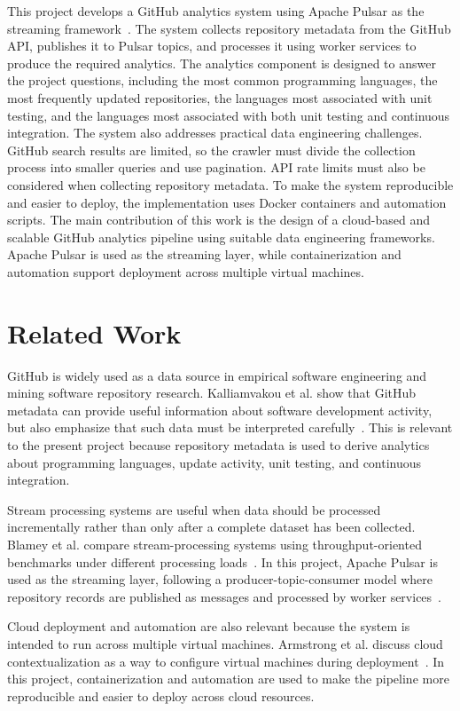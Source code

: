 \documentclass[conference]{IEEEtran}
\begin{document}
This project develops a GitHub analytics system using Apache Pulsar as the
streaming framework~\cite{apache_pulsar}. The system collects repository metadata from the GitHub
API, publishes it to Pulsar topics, and processes it using worker services to
produce the required analytics. The analytics component is designed to answer
the project questions, including the most common programming languages, the
most frequently updated repositories, the languages most associated with unit
testing, and the languages most associated with both unit testing and
continuous integration.
The system also addresses practical data engineering challenges. GitHub search
results are limited, so the crawler must divide the collection process into
smaller queries and use pagination. API rate limits must also be considered
when collecting repository metadata. To make the system reproducible and easier
to deploy, the implementation uses Docker containers and automation scripts.
The main contribution of this work is the design of a cloud-based and scalable
GitHub analytics pipeline using suitable data engineering frameworks. Apache
Pulsar is used as the streaming layer, while containerization and automation
support deployment across multiple virtual machines.

\section{Related Work}
\label{sec:related-work}
GitHub is widely used as a data source in empirical software engineering and
mining software repository research. Kalliamvakou et al. show that GitHub
metadata can provide useful information about software development activity, but
also emphasize that such data must be interpreted
carefully~\cite{kalliamvakou2014promises}. This is relevant to the present
project because repository metadata is used to derive analytics about
programming languages, update activity, unit testing, and continuous
integration.

Stream processing systems are useful when data should be processed
incrementally rather than only after a complete dataset has been collected.
Blamey et al. compare stream-processing systems using throughput-oriented
benchmarks under different processing loads~\cite{blamey2019apache}. In this
project, Apache Pulsar is used as the streaming layer, following a
producer-topic-consumer model where repository records are published as
messages and processed by worker services~\cite{apache_pulsar}.

Cloud deployment and automation are also relevant because the system is
intended to run across multiple virtual machines. Armstrong et al. discuss
cloud contextualization as a way to configure virtual machines during
deployment~\cite{armstrong2015contextualization}. In this project,
containerization and automation are used to make the pipeline more reproducible
and easier to deploy across cloud resources.
\end{document}
